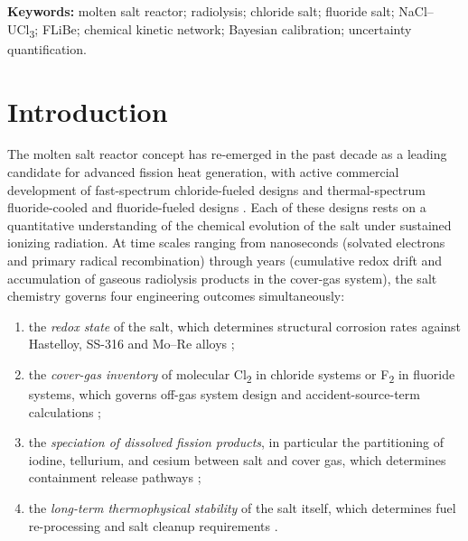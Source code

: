 \documentclass[11pt]{article}
\theoremstyle{plain}
\theoremstyle{definition}
\theoremstyle{remark}
\begin{document}
\noindent\textbf{Keywords:}
molten salt reactor;
radiolysis;
chloride salt;
fluoride salt;
NaCl--UCl\textsubscript{3};
FLiBe;
chemical kinetic network;
Bayesian calibration;
uncertainty quantification.

\bigskip

\section{Introduction}\label{sec:intro}

The molten salt reactor concept has re-emerged in the past decade as a leading
candidate for advanced fission heat generation, with active commercial
development of fast-spectrum chloride-fueled designs
\citep{Phillips2022,TerraPower2021} and thermal-spectrum fluoride-cooled and
fluoride-fueled designs \citep{Forsberg2020,Andreades2014,Holcomb2012}.  Each
of these designs rests on a quantitative understanding of the chemical
evolution of the salt under sustained ionizing radiation.  At time scales
ranging from nanoseconds (solvated electrons and primary radical
recombination) through years (cumulative redox drift and accumulation of
gaseous radiolysis products in the cover-gas system), the salt chemistry
governs four engineering outcomes simultaneously:

\begin{enumerate}
\item the \emph{redox state} of the salt, which determines structural
      corrosion rates against Hastelloy, SS-316 and Mo--Re alloys
      \citep{Carotti2017,Olander2002};
\item the \emph{cover-gas inventory} of molecular Cl\textsubscript{2} in
      chloride systems or F\textsubscript{2} in fluoride systems, which
      governs off-gas system design and accident-source-term calculations
      \citep{Sohal2010,IAEA2013MSR};
\item the \emph{speciation of dissolved fission products}, in particular the
      partitioning of iodine, tellurium, and cesium between salt and cover
      gas, which determines containment release pathways
      \citep{Briggs1964,Williams2006};
\item the \emph{long-term thermophysical stability} of the salt itself,
      which determines fuel re-processing and salt cleanup requirements
      \citep{Romatoski2017}.
\end{enumerate}
\end{document}
